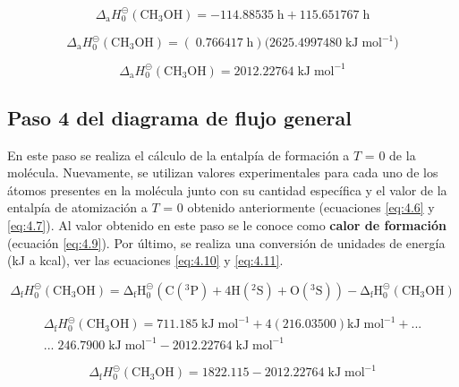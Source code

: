 \begin{equation}
	\Delta_\mathrm{{a}} H^{\circleddash}_{0}\mathrm{(CH_3OH) = -114.88535\;\mathrm{h} + 115.651767\;\mathrm{h}}
\end{equation}

\begin{equation}
	\Delta_\mathrm{{a}} H^{\circleddash}_{0}\mathrm{(CH_3OH) = (\;0.766417\;\mathrm{h})(2625.4997480\;\mathrm{kJ\;mol^{-1})}}
\label{eq:4.4}
\end{equation}

\begin{equation}
	\Delta_\mathrm{{a}} H^{\circleddash}_{0}\mathrm{(CH_3OH) = 2012.22764\; \mathrm{kJ\;mol^{-1}}}
\label{eq:4.5}
\end{equation}
 
\subsection{Paso 4 del diagrama de flujo general}

En este paso se realiza el cálculo de la entalpía de formación a $T$ = 0 de la molécula. Nuevamente, se utilizan valores experimentales para cada uno de los átomos presentes en la molécula junto con su cantidad específica y el valor de la entalpía de atomización a $T$ = 0 obtenido anteriormente (ecuaciones \ref{eq:4.6} y \ref{eq:4.7}). Al valor obtenido en este paso se le conoce como \textbf{calor de formación} (ecuación \ref{eq:4.9}). Por último, se realiza una conversión de unidades de energía (kJ a kcal), ver las ecuaciones \ref{eq:4.10} y \ref{eq:4.11}. 

\begin{equation}
	\Delta_\mathrm{{f}} H^{\circleddash}_{0}\mathrm{(CH_3OH) = \Delta_{f} H^{\circleddash}_{0}(C(^{3}P) + 4H(^{2}S) + O(^{3}S))- \Delta_{f} H^{\circleddash}_{0} (CH_{3}OH)}
\label{eq:4.6}
\end{equation}

\begin{multline}
	\Delta_\mathrm{{f}} H^{\circleddash}_{0}\mathrm{(CH_3OH)} = 711.185\;\mathrm{kJ\;mol^{-1}} + 4(216.03500)\mathrm{kJ\;mol^{-1}} +...\\
	...\; 246.7900\;\mathrm{kJ\;mol^{-1}} - 2012.22764\; \mathrm{kJ\;mol^{-1}}
\label{eq:4.7}
\end{multline}

\begin{equation}
	\Delta_\mathrm{{f}} H^{\circleddash}_{0}\mathrm{(CH_3OH) = 1822.115 - 2012.22764\; kJ\;mol^{-1}}
\end{equation}

